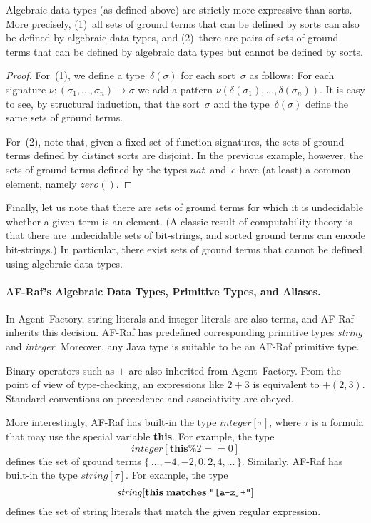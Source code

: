\documentclass[a4paper,12pt,oneside,fleqn]{book} %
\newcommand{\rg}[1]{\marginpar{\tiny\raggedright\textcolor{blue}{\bf rg:} #1}}
\begin{document}
\begin{proposition}
Algebraic data types (as defined above) are strictly more expressive than
sorts. More precisely, (1)~all sets of ground terms that can be defined by
sorts can also be defined by algebraic data types, and (2)~there are pairs
of sets of ground terms that can be defined by algebraic data types but
cannot be defined by sorts.
\end{proposition}

\begin{proof}
For~(1), we define a type~$\delta(\sigma)$ for each sort~$\sigma$ as
follows: For each signature $\nu:(\sigma_1,\ldots,\sigma_n)\to\sigma$ we
add a pattern $\nu(\delta(\sigma_1),\ldots,\delta(\sigma_n))$. It is easy
to see, by structural induction, that the sort~$\sigma$ and the
type~$\delta(\sigma)$ define the same sets of ground terms.

For~(2), note that, given a fixed set of function signatures, the sets of
ground terms defined by distinct sorts are disjoint. In the previous
example, however, the sets of ground terms defined by the types
$\mathit{nat}$~and~$e$ have (at least) a common element, namely
$\mathit{zero}()$.
\end{proof}

Finally, let us note that there are sets of ground terms for which it is
undecidable whether a given term is an element.  (A classic result of
computability theory is that there are undecidable sets of bit-strings, and
sorted ground terms can encode bit-strings.) In particular, there exist
sets of ground terms that cannot be defined using algebraic data types.


\paragraph{AF-Raf's Algebraic Data Types, Primitive Types, and Aliases.}
In Agent~Factory, string literals and integer literals are
also terms, and AF-Raf inherits this decision. AF-Raf has
predefined corresponding primitive types \textit{string} and
\textit{integer}. Moreover, any Java type is suitable to be an AF-Raf
primitive type.

Binary operators such as $+$ are also inherited from Agent~Factory. From
the point of view of type-checking, an expressions like $2+3$ is equivalent
to $+(2,3)$. Standard conventions on precedence and associativity are
obeyed.

More interestingly, AF-Raf has built-in the type $\mathit{integer}[\tau]$,
where $\tau$ is a formula that may use the special variable \textbf{this}.
For example, the type \[\mathit{integer}[\mathbf{this}\%2==0]\] defines the
set of ground terms $\{\,\ldots,-4,-2,0,2,4,\ldots\,\}$. Similarly, AF-Raf
has built-in the type $\mathit{string}[\tau]$. For example, the type
\[\mathit{string}[\mathbf{this}\;\mathbf{matches}\;\verb|"[a-z]+"|]\]
defines the set of string literals that match the given regular expression.
\end{document}
